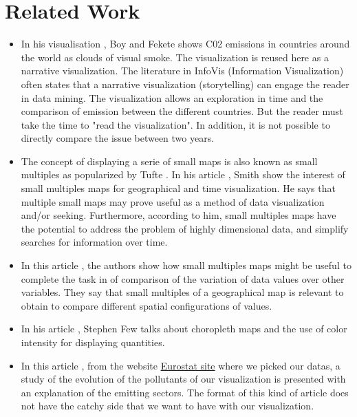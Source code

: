 \documentclass[preprint,journal]{vgtc}       %
\begin{document}
\section{Related Work}

\begin{itemize}
\item In his visualisation \cite{Boy:2014:TCP}, Boy and Fekete shows C02 emissions in countries around the world as clouds of visual smoke. The visualization is reused here \cite{Mediapart:2014:CPM} as a narrative visualization. The literature in InfoVis (Information Visualization) often states that a narrative visualization (storytelling) can engage the reader in data mining. The visualization allows an exploration in time and the comparison of emission between the different countries. But the reader must take the time to "read the visualization". In addition, it is not possible to directly compare the issue between two years.

\item The concept of displaying a serie of small maps is also known as small multiples as popularized by Tufte \cite{Tufte:1983:VDQ}. In his article \cite{Smith:2005:MSM}, Smith show the interest of small multiples maps for geographical and time visualization. He says that multiple small maps may prove useful as a method of data visualization and/or seeking. Furthermore, according to him, small multiples maps have the potential to address the problem of highly dimensional data, and simplify searches for information over time.

\item In this article \cite{Reimer:2011:SSM}, the authors show how small multiples maps might be useful to complete the task in of comparison of the variation of data values over other variables. They say that small multiples of a geographical map is relevant to obtain to compare different spatial configurations of values.

\item In his article \cite{Few:2009:GDV}, Stephen Few talks about choropleth maps and the use of color intensity for displaying quantities.

\item In this article \cite{Eurostats:2016:VMC}, from the website \href{http://ec.europa.eu/}{Eurostat site} where we picked our datas, a study of the evolution of the pollutants of our visualization is presented with an explanation of the emitting sectors. The format of this kind of article does not have the catchy side that we want to have with our visualization.


\end{itemize}
\end{document}
